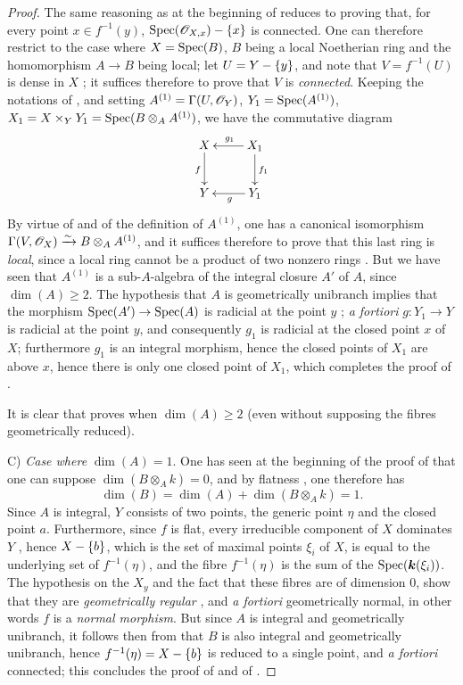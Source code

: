 \begin{proof}
The same reasoning as at the beginning of  reduces to proving that, for every point $x\in f^{-1}(y)$, $\operatorname{Spec}(\mathscr{O}_{X,x})-\{x\}$ is connected.
One can therefore restrict to the case where $X=\operatorname{Spec}(B)$, $B$ being a local Noetherian ring and the homomorphism $A\to B$ being local;
let $U=Y-\{y\}$, and note that $V=f^{-1}(U)$ is dense in $X$ ;
it suffices therefore to prove that $V$ is \emph{connected}.
Keeping the notations of , and setting $A^{(1)}=\Gamma(U,\mathscr{O}_{Y})$, $Y_1=\operatorname{Spec}(A^{(1)})$, $X_1=X\times_{Y}Y_1=\operatorname{Spec}(B\otimes_{A}A^{(1)})$, we have the commutative diagram
\[
  \xymatrix{
    X \ar[d]_{f} & X_1 \ar[l]_{g_1} \ar[d]^{f_1} \\
    Y & Y_1 \ar[l]^{g}
  }
\]
By virtue of  and of the definition of $A^{(1)}$, one has a canonical isomorphism $\Gamma(V,\mathscr{O}_{X})\xrightarrow{\sim}B\otimes_{A}A^{(1)}$, and it suffices therefore to prove that this last ring is \emph{local}, since a local ring cannot be a product of two nonzero rings .
But we have seen  that $A^{(1)}$ is a sub-$A$-algebra of the integral closure $A'$ of $A$, since $\dim(A)\geq 2$.
The hypothesis that $A$ is geometrically unibranch implies that the morphism $\operatorname{Spec}(A')\to\operatorname{Spec}(A)$ is radicial at the point $y$ ;
\emph{a fortiori} $g:Y_1\to Y$ is radicial at the point $y$, and consequently $g_1$ is radicial at the closed point $x$ of $X$;
furthermore $g_1$ is an integral morphism, hence the closed points of $X_1$ are above $x$, hence there is only one closed point of $X_1$, which completes the proof of .

It is clear that  proves  when $\dim(A)\geq 2$ (even without supposing the fibres geometrically reduced).

C) \emph{Case where} $\dim(A)=1$.
One has seen at the beginning of the proof of  that one can suppose $\dim(B\otimes_{A}k)=0$, and by flatness , one therefore has
\[
  \dim(B)=\dim(A)+\dim(B\otimes_{A}k)=1.
\]
Since $A$ is integral, $Y$ consists of two points, the generic point $\eta$ and the closed point $a$.
Furthermore, since $f$ is flat, every irreducible component of $X$ dominates $Y$ , hence $X-\{b\}$, which is the set of maximal points $\xi_i$ of $X$, is equal to
the underlying set of $f^{-1}(\eta)$, and the fibre $f^{-1}(\eta)$ is the sum of the $\operatorname{Spec}(\boldsymbol{k}(\xi_i))$.
The hypothesis on the $X_y$ and the fact that these fibres are of dimension 0, show that they are \emph{geometrically regular} , and \emph{a fortiori} geometrically normal, in other words $f$ is a \emph{normal morphism}.
But since $A$ is integral and geometrically unibranch, it follows then from  that $B$ is also integral and geometrically unibranch, hence $f^{-1}(\eta)=X-\{b\}$ is reduced to a single point, and \emph{a fortiori} connected;
this concludes the proof of  and of .
\end{proof}

